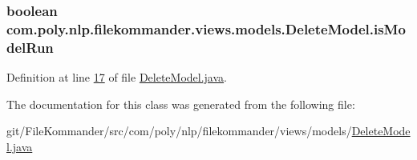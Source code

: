 \hypertarget{classcom_1_1poly_1_1nlp_1_1filekommander_1_1views_1_1models_1_1_delete_model_a539d8d947cd5217ffb0ba4dfd1e7661d}{
\subsubsection[{is\-Model\-Run}]{\setlength{\rightskip}{0pt plus 5cm}boolean com.\-poly.\-nlp.\-filekommander.\-views.\-models.\-Delete\-Model.\-is\-Model\-Run\hspace{0.3cm}{\ttfamily [private]}}}\label{classcom_1_1poly_1_1nlp_1_1filekommander_1_1views_1_1models_1_1_delete_model_a539d8d947cd5217ffb0ba4dfd1e7661d}


Definition at line \hyperlink{L17}{17} of file \hyperlink{}{Delete\-Model.\-java}.



The documentation for this class was generated from the following file\-:\begin{DoxyCompactItemize}
\item 
git/\-File\-Kommander/src/com/poly/nlp/filekommander/views/models/\hyperlink{_delete_model_8java}{Delete\-Model.\-java}\end{DoxyCompactItemize}

